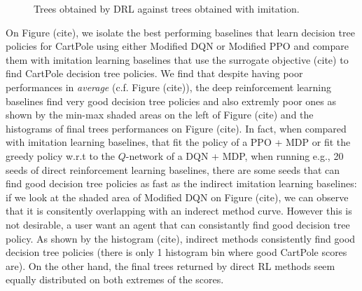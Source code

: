 \begin{figure}[htbp]
    \caption{Trees obtained by DRL against trees obtained with imitation.}
    \label{fig:trees-drl}
\end{figure}


On Figure (cite), we isolate the best performing baselines that learn decision tree policies for CartPole using either Modified DQN or Modified PPO and compare them with imitation learning baselines that use the surrogate objective (cite) to find CartPole decision tree policies.
We find that despite having poor performances in \textit{average} (c.f. Figure (cite)), the deep reinforcement learning baselines find very good decision tree policies and also extremly poor ones as shown by the min-max shaded areas on the left of Figure (cite) and the histograms of final trees performances on Figure (cite).
In fact, when compared with imitation learning baselines, that fit the policy of a PPO + MDP or fit the greedy policy w.r.t to the $Q$-network of a DQN + MDP, when running e.g., 20 seeds of direct reinforcement learning baselines, there are some seeds that can find good decision tree policies as fast as the indirect imitation learning baselines: if we look at the shaded area of Modified DQN on Figure (cite), we can observe that it is consitently overlapping with an inderect method curve.
However this is not desirable, a user want an agent that can consistantly find good decision tree policy.
As shown by the histogram (cite), indirect methods consistently find good decision tree policies (there is only 1 histogram bin where good CartPole scores are). On the other hand, the final trees returned by direct RL methods seem equally distributed on both extremes of the scores.

